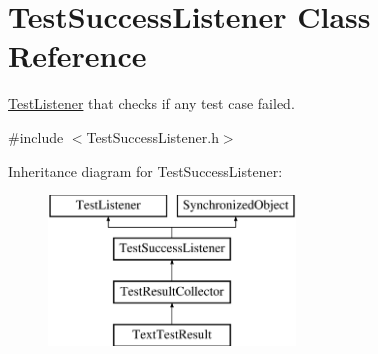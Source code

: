 \hypertarget{class_test_success_listener}{}\section{Test\+Success\+Listener Class Reference}
\label{class_test_success_listener}


\hyperlink{class_test_listener}{Test\+Listener} that checks if any test case failed.  




{\ttfamily \#include $<$Test\+Success\+Listener.\+h$>$}

Inheritance diagram for Test\+Success\+Listener\+:\begin{figure}[H]
\begin{center}
\leavevmode
\includegraphics[height=4.000000cm]{class_test_success_listener}
\end{center}
\end{figure}
